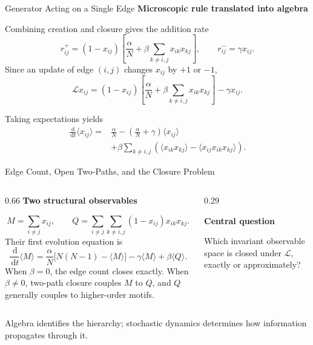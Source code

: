 \documentclass[11pt]{beamer}
\newcommand{\eyebrow}[1]{%
  {\color{accent}\bfseries #1}\par
  \vspace{0.04cm}{\color{lightgray}\rule{\linewidth}{0.45pt}}\vspace{0.10cm}}
\newcommand{\keyterm}[1]{\textcolor{accent}{\bfseries #1}}
\newcommand{\dd}{\,\mathrm d}
\begin{document}
\begin{frame}{Generator Acting on a Single Edge}
  \small
  \eyebrow{Microscopic rule translated into algebra}

  Combining creation and closure gives the addition rate
  \[
    r_{ij}^{+}=(1-x_{ij})
    \left[\frac{\alpha}{N}+\beta\sum_{k\neq i,j}x_{ik}x_{kj}\right],
    \qquad
    r_{ij}^{-}=\gamma x_{ij}.
  \]
  Since an update of edge $(i,j)$ changes $x_{ij}$ by $+1$ or $-1$,
  \[
    \mathcal Lx_{ij}
    =(1-x_{ij})
    \left[\frac{\alpha}{N}+\beta\sum_{k\neq i,j}x_{ik}x_{kj}\right]
    -\gamma x_{ij}.
  \]

  \vspace{0.25cm}
  Taking expectations yields
  \begin{align*}
    \frac{\dd}{\dd t}\langle x_{ij}\rangle
    ={}&\frac{\alpha}{N}
    -\left(\frac{\alpha}{N}+\gamma\right)\langle x_{ij}\rangle\\
    &+\beta\sum_{k\neq i,j}
    \left(\langle x_{ik}x_{kj}\rangle
    -\langle x_{ij}x_{ik}x_{kj}\rangle\right).
  \end{align*}
\end{frame}

\begin{frame}{Edge Count, Open Two-Paths, and the Closure Problem}
  \small
  \begin{columns}[T,onlytextwidth]
    \begin{column}{0.66\textwidth}
      \eyebrow{Two structural observables}
      \[
        M=\sum_{i\neq j}x_{ij},
        \qquad
        Q=\sum_{i\neq j}\sum_{k\neq i,j}
        (1-x_{ij})x_{ik}x_{kj}.
      \]
      Their first evolution equation is
      \[
        \frac{\dd}{\dd t}\langle M\rangle
        =\frac{\alpha}{N}\big[N(N-1)-\langle M\rangle\big]
        -\gamma\langle M\rangle+\beta\langle Q\rangle.
      \]
      When $\beta=0$, the edge count closes exactly. When $\beta\neq0$, two-path closure couples $M$ to $Q$, and $Q$ generally couples to higher-order motifs.
    \end{column}
    \begin{column}{0.29\textwidth}
      \centering
      \vspace{0.55cm}

      \vspace{0.55cm}
      \raggedright
      \keyterm{Central question}\par
      Which invariant observable space is closed under $\mathcal L$, exactly or approximately?
    \end{column}
  \end{columns}

  \vfill
  {\color{softgray}\small
  Algebra identifies the hierarchy; stochastic dynamics determines how information propagates through it.}
\end{frame}
\end{document}
